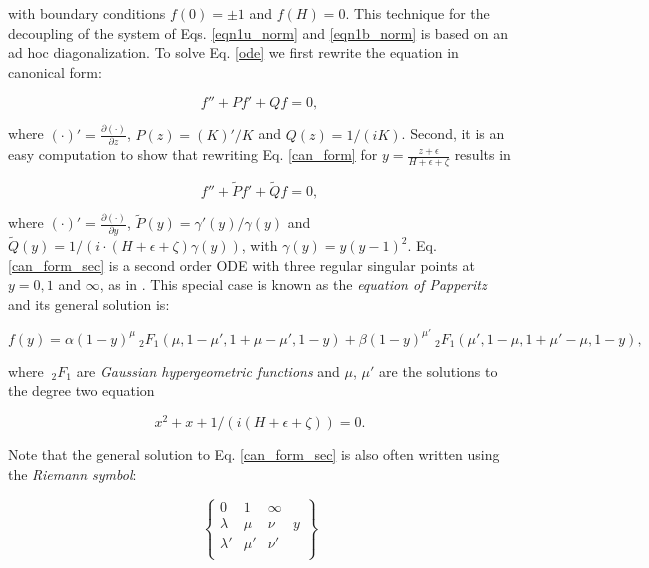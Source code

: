 %
with boundary conditions $f(0)=\pm 1$ and $f(H) = 0$.
This technique for the decoupling of the system of Eqs. \ref{eqn1u_norm} and \ref{eqn1b_norm} is based on an ad hoc diagonalization.
%
To solve Eq. \ref{ode} we first rewrite the equation in canonical form:
%
\begin{linenomath*}
\begin{equation}
	\label{can_form}
	f''+P f'+ Qf =0,
\end{equation}
\end{linenomath*}
%
where $(\cdot)' = \frac{\partial (\cdot)}{\partial z}$, $P(z)=(K)'/K$ and $Q(z)=1/(i K)$. Second, it is an easy computation to show that rewriting Eq. \ref{can_form} for $y = \frac{z + \epsilon}{H + \epsilon + \zeta}
$ results in
%
\begin{linenomath*}
\begin{equation}
	\label{can_form_sec}
	f''+\widetilde{P} f'+ \widetilde{Q} f =0,
\end{equation}
\end{linenomath*}
%
where $(\cdot)' = \frac{\partial (\cdot)}{\partial y}$, $\widetilde{P}(y)=\gamma'(y)/\gamma(y)$ and $\widetilde{Q}(y)=1/( i \cdot (H+\epsilon+\zeta) \gamma(y))$, with $\gamma(y)=y(y-1)^2$.
Eq. \ref{can_form_sec} is a second order ODE with three regular singular points at $y = 0,1$ and $\infty$, as in \citet{Morse1954a}. 
This special case is known as the \emph{equation of Papperitz} and its general solution is:
%
\begin{linenomath*}
\begin{equation}
	f(y) = \alpha (1-y)^\mu \ _2F_1 (\mu, 1- \mu', 1+\mu-\mu', 1-y)
	+\beta (1-y)^{\mu'} \ _2F_1 (\mu', 1- \mu, 1+\mu'-\mu, 1-y),
	\label{gen_sol_g}
\end{equation}
\end{linenomath*}
%
where $\ _2F_1$ are \emph{Gaussian hypergeometric functions} and $\mu$, $\mu'$ are the solutions to the degree two equation
%
\begin{linenomath*}
\begin{equation*}
	x^2+x+1/( i (H+ \epsilon + \zeta))=0.
\end{equation*}
\end{linenomath*}
%
Note that the general solution to Eq. \ref{can_form_sec} is also often written using the \emph{Riemann symbol}:
%
\begin{linenomath*}
\begin{equation*}
\left \{
\begin{array}{cccc}
0 & 1 & \infty &  \\
\lambda & \mu & \nu & y\\
\lambda' & \mu' & \nu' & \\
\end{array}
\right \}
\end{equation*}
\end{linenomath*}
